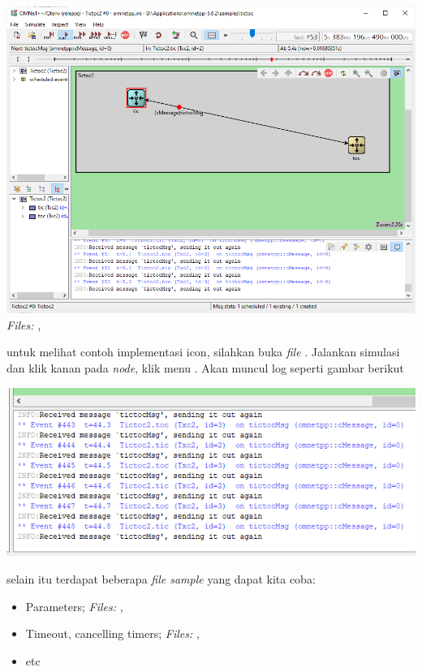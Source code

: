 \documentclass[conference]{IEEEtran}
\begin{document}
\includegraphics[scale=0.25]{images/tictoc2.ned.png}
\textit{Files:} , 


untuk melihat contoh implementasi icon, silahkan buka \textit{file} . Jalankan simulasi dan klik kanan pada \textit{node}, klik menu . Akan muncul log seperti gambar berikut

\includegraphics[scale=0.38]{images/tictoc3-log.ned.png}


selain itu terdapat beberapa \textit{file sample} yang dapat kita coba:
\begin{itemize}
	\item Parameters; \textit{Files: }, 
	\item Timeout, cancelling timers; \textit{Files: }, 
	\item etc
\end{itemize}
\end{document}
